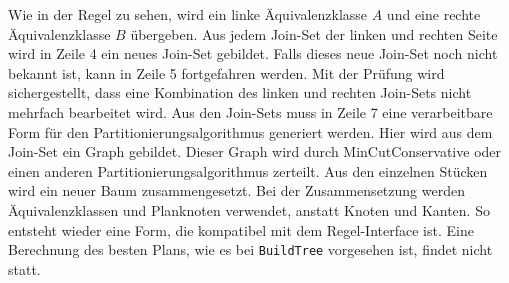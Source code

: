Wie in der Regel zu sehen, wird ein linke Äquivalenzklasse $A$ und eine rechte Äquivalenzklasse $B$ übergeben. Aus jedem Join-Set der linken und rechten Seite wird in Zeile 4 ein neues Join-Set gebildet. Falls dieses neue Join-Set noch nicht bekannt ist, kann in Zeile 5 fortgefahren werden.  Mit der Prüfung wird sichergestellt, dass eine Kombination des linken und rechten Join-Sets nicht mehrfach bearbeitet wird. Aus den Join-Sets muss in Zeile 7 eine verarbeitbare Form für den Partitionierungsalgorithmus generiert werden. Hier wird aus dem Join-Set ein Graph gebildet. Dieser Graph wird durch MinCutConservative oder einen anderen Partitionierungsalgorithmus zerteilt. Aus den einzelnen Stücken wird ein neuer Baum zusammengesetzt. Bei der Zusammensetzung werden Äquivalenzklassen und Planknoten verwendet, anstatt Knoten und Kanten. So entsteht wieder eine Form, die kompatibel mit dem Regel-Interface ist. Eine Berechnung des besten Plans, wie es bei \texttt{BuildTree} vorgesehen ist, findet nicht statt.










